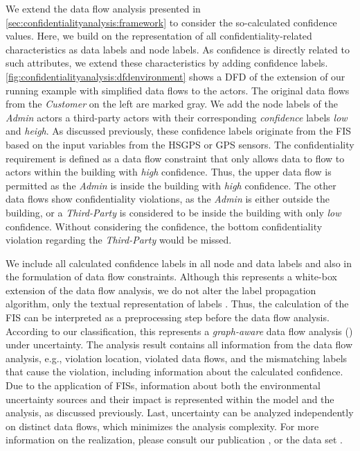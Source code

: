 We extend the data flow analysis presented in \autoref{sec:confidentialityanalysis:framework} to consider the so-calculated confidence values.
Here, we build on the representation of all confidentiality-related characteristics as data labels and node labels.
As confidence is directly related to such attributes, we extend these characteristics by adding confidence labels. 
\autoref{fig:confidentialityanalysis:dfdenvironment} shows a \ac{DFD} of the extension of our running example with simplified data flows to the actors.
The original data flows from the \emph{Customer} on the left are marked gray.
We add the node labels of the \emph{Admin} actors a third-party actors with their corresponding \emph{confidence} labels \emph{low} and \emph{heigh}.
As discussed previously, these confidence labels originate from the \ac{FIS} based on the input variables from the HSGPS or GPS sensors.
The confidentiality requirement is defined as a data flow constraint that only allows data to flow to actors within the building with \emph{high} confidence.
Thus, the upper data flow is permitted as the \emph{Admin} is inside the building with \emph{high} confidence.
The other data flows show confidentiality violations, as the \emph{Admin} is either outside the building, or a \emph{Third-Party} is considered to be inside the building with only \emph{low} confidence.
Without considering the confidence, the bottom confidentiality violation regarding the \emph{Third-Party} would be missed.

We include all calculated confidence labels in all node and data labels and also in the formulation of data flow constraints.
Although this represents a white-box extension of the data flow analysis, we do not alter the label propagation algorithm, only the textual representation of labels \cite{boltz_handling_2022}.
Thus, the calculation of the \ac{FIS} can be interpreted as a preprocessing step before the data flow analysis.
According to our classification, this represents a \emph{graph-aware} data flow analysis () under uncertainty.
The analysis result contains all information from the data flow analysis, e.g., violation location, violated data flows, and the mismatching labels that cause the violation, including information about the calculated confidence.
Due to the application of \acp{FIS}, information about both the environmental uncertainty sources and their impact is represented within the model and the analysis, as discussed previously.
Last, uncertainty can be analyzed independently on distinct data flows, which minimizes the analysis complexity.
For more information on the realization, please consult our publication \cite{boltz_handling_2022}, or the data set \cite{dataset}.

